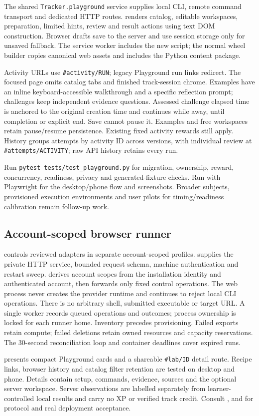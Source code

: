 The shared \texttt{Tracker.playground} service supplies local CLI, remote command
transport and dedicated HTTP routes.  renders catalog,
editable workspaces, preparation, limited hints, review and result actions using
text DOM construction. Browser drafts save to the server and use session storage
only for unsaved fallback. The service worker includes the new script; the normal
wheel builder copies canonical web assets and includes the Python content package.

Activity URLs use \texttt{\#activity/RUN}; legacy Playground run links redirect.
The focused page omits catalog tabs and finished track-session chrome. Examples
have an inline keyboard-accessible walkthrough and a specific reflection prompt;
challenges keep independent evidence questions. Assessed challenge elapsed time
is anchored to the original creation time and continues while away, until
completion or explicit end. Save cannot pause it. Examples and free workspaces
retain pause/resume persistence. Existing fixed activity rewards still apply.
History groups attempts by activity ID across versions, with individual review
at \texttt{\#attempts/ACTIVITY}; raw API history retains every run.

Run \texttt{pytest tests/test\_playground.py} for migration, ownership, reward,
concurrency, readiness, privacy and generated-fixture checks. Run
 with Playwright for the desktop/phone flow and
screenshots. Broader subjects, provisioned execution environments and user pilots
for timing/readiness calibration remain follow-up work.

\subsection{Account-scoped browser runner}
 controls reviewed adapters in separate
account-scoped profiles.  supplies the private
HTTP service, bounded request schema, machine authentication and restart sweep.
 derives account scopes from the installation
identity and authenticated account, then forwards only fixed control operations.
The web process never creates the provider runtime and continues to reject local
CLI operations. There is no arbitrary shell, submitted executable or target URL.
A single worker records queued operations and outcomes; process ownership is
locked for each runner home. Inventory precedes provisioning. Failed exports
retain compute; failed deletions retain owned resources and capacity reservations.
The 30-second reconciliation loop and container deadlines cover expired runs.

 presents compact Playground cards and a shareable
\texttt{\#lab/ID} detail route. Recipe links, browser history and catalog filter
retention are tested on desktop and phone. Details contain setup, commands,
evidence, sources and the optional server workspace. Server observations are
labelled separately from learner-controlled local results and carry no XP or
verified track credit. Consult ,
 and
 for protocol and real deployment acceptance.
